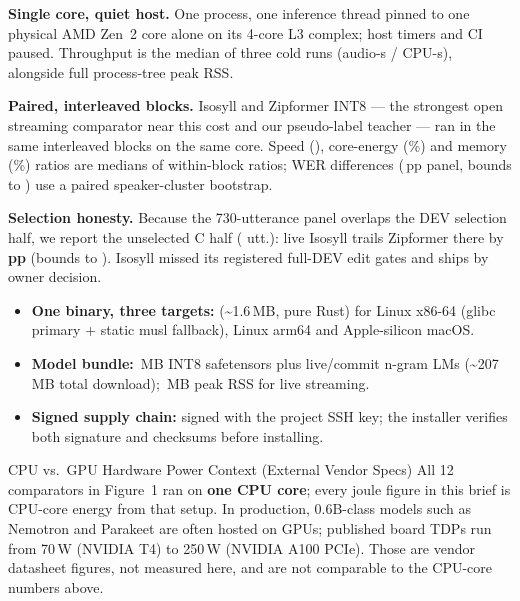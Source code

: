 \documentclass[letterpaper]{article}
\begin{document}
\noindent
\begin{minipage}[t]{0.486\textwidth}
  \vspace{0pt}
  {\fontsize{7.8}{9.8}\selectfont
  \textbf{Single core, quiet host.} One process, one inference thread pinned to one physical AMD Zen~2 core alone on its 4-core L3 complex; host timers and CI paused. Throughput is the median of three cold runs (audio-s / CPU-s), alongside full process-tree peak RSS.

  \vspace{2.5pt}
  \textbf{Paired, interleaved blocks.} Isosyll and Zipformer INT8 --- the strongest open streaming comparator near this cost and our pseudo-label teacher --- ran in the same interleaved blocks on the same core. Speed (\VsSpeedXOne\x), core-energy (\VsEnergyPctOne\%) and memory (\VsRssPctOne\%) ratios are medians of within-block ratios; WER differences (\VsDeltaOne\,pp panel, bounds \VsLoOne{} to \VsHiOne) use a paired speaker-cluster bootstrap.

  \vspace{2.5pt}
  \textbf{Selection honesty.} Because the 730-utterance panel overlaps the DEV selection half, we report the unselected C half (\CandCUtts{} utt.): live Isosyll trails Zipformer there by \textbf{\CandLiveLmCDelta\,pp} (bounds \CandLiveLmCLo{} to \CandLiveLmCHi). Isosyll \releasever{} missed its registered full-DEV edit gates and ships by owner decision.
  }

  \vspace{3.5pt}
  {\fontsize{7.7}{9.7}\selectfont\raggedright
  \begin{itemize}[leftmargin=1.12em,itemsep=1.6pt,topsep=1.5pt]
    \item \textbf{One binary, three targets:}  (\textasciitilde 1.6\,MB, pure Rust) for Linux x86-64 (glibc primary + static musl fallback), Linux arm64 and Apple-silicon macOS.
    \item \textbf{Model bundle:} \ColdRcTwoLiveLmModel\,MB INT8 safetensors plus live/commit n-gram LMs (\textasciitilde 207\,MB total download); \ColdRcTwoLiveLmRss\,MB peak RSS for live streaming.
    \item \textbf{Signed supply chain:}  signed with the project SSH key; the installer verifies both signature and checksums before installing.
  \end{itemize}
  }

  \vspace{2.5pt}
  \begin{execbox}[emerald]{CPU vs.\ GPU Hardware Power Context (External Vendor Specs)}
    All 12 comparators in Figure~1 ran on \textbf{one CPU core}; every joule figure in this brief is CPU-core energy from that setup. In production, 0.6B-class models such as Nemotron and Parakeet are often hosted on GPUs; published board TDPs run from 70\,W (NVIDIA T4) to 250\,W (NVIDIA A100 PCIe). Those are vendor datasheet figures, not measured here, and are not comparable to the CPU-core numbers above.
  \end{execbox}
\end{minipage}\hfill
\end{document}

